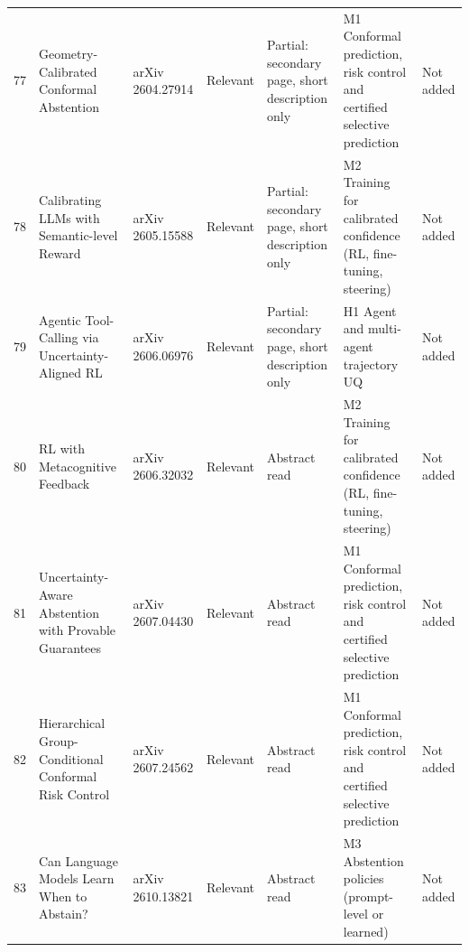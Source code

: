 \documentclass[acmsmall]{acmart}
\begin{document}
\begin{center}
\begin{longtable}{@{}r p{3.0cm} p{2.0cm} p{1.5cm} p{2.3cm} p{2.6cm} p{1.2cm}@{}}
77 & Geometry-Calibrated Conformal Abstention & arXiv 2604.27914 & Relevant & Partial: secondary page, short description only & M1 Conformal prediction, risk control and certified selective prediction & Not added \\
78 & Calibrating LLMs with Semantic-level Reward & arXiv 2605.15588 & Relevant & Partial: secondary page, short description only & M2 Training for calibrated confidence (RL, fine-tuning, steering) & Not added \\
79 & Agentic Tool-Calling via Uncertainty-Aligned RL & arXiv 2606.06976 & Relevant & Partial: secondary page, short description only & H1 Agent and multi-agent trajectory UQ & Not added \\
80 & RL with Metacognitive Feedback & arXiv 2606.32032 & Relevant & Abstract read & M2 Training for calibrated confidence (RL, fine-tuning, steering) & Not added \\
81 & Uncertainty-Aware Abstention with Provable Guarantees & arXiv 2607.04430 & Relevant & Abstract read & M1 Conformal prediction, risk control and certified selective prediction & Not added \\
82 & Hierarchical Group-Conditional Conformal Risk Control & arXiv 2607.24562 & Relevant & Abstract read & M1 Conformal prediction, risk control and certified selective prediction & Not added \\
83 & Can Language Models Learn When to Abstain? & arXiv 2610.13821 & Relevant & Abstract read & M3 Abstention policies (prompt-level or learned) & Not added \\
\end{longtable}
\end{center}
\end{document}
